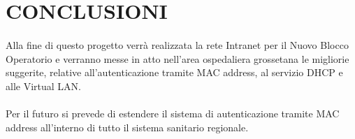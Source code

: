 \section{CONCLUSIONI}
\paragraph{} Alla fine di questo progetto verrà realizzata la rete Intranet per il Nuovo Blocco Operatorio e verranno messe in atto nell'area ospedaliera grossetana le migliorie suggerite, relative all'autenticazione tramite MAC address, al servizio DHCP e alle Virtual LAN. 
\paragraph{} Per il futuro si prevede di estendere il sistema di autenticazione tramite MAC address all'interno di tutto il sistema sanitario regionale.
